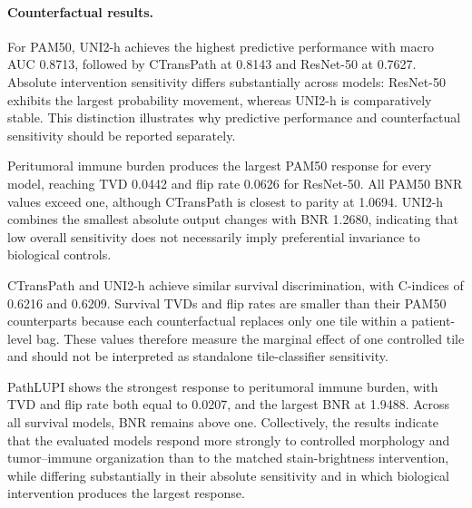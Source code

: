 \paragraph{Counterfactual results.}
For PAM50, UNI2-h achieves the highest predictive performance with macro AUC 0.8713, followed by CTransPath at 0.8143 and ResNet-50 at 0.7627. Absolute intervention sensitivity differs substantially across models: ResNet-50 exhibits the largest probability movement, whereas UNI2-h is comparatively stable. This distinction illustrates why predictive performance and counterfactual sensitivity should be reported separately.

Peritumoral immune burden produces the largest PAM50 response for every model, reaching TVD 0.0442 and flip rate 0.0626 for ResNet-50. All PAM50 BNR values exceed one, although CTransPath is closest to parity at 1.0694. UNI2-h combines the smallest absolute output changes with BNR 1.2680, indicating that low overall sensitivity does not necessarily imply preferential invariance to biological controls.

CTransPath and UNI2-h achieve similar survival discrimination, with C-indices of 0.6216 and 0.6209. Survival TVDs and flip rates are smaller than their PAM50 counterparts because each counterfactual replaces only one tile within a patient-level bag. These values therefore measure the marginal effect of one controlled tile and should not be interpreted as standalone tile-classifier sensitivity.

PathLUPI shows the strongest response to peritumoral immune burden, with TVD and flip rate both equal to 0.0207, and the largest BNR at 1.9488. Across all survival models, BNR remains above one. Collectively, the results indicate that the evaluated models respond more strongly to controlled morphology and tumor--immune organization than to the matched stain-brightness intervention, while differing substantially in their absolute sensitivity and in which biological intervention produces the largest response.

